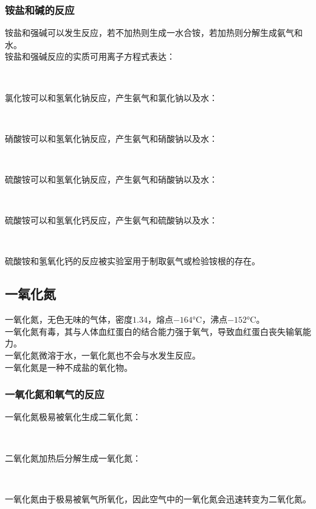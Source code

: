 \documentclass[UTF8]{ctexart}
\begin{document}
\subsubsection{铵盐和碱的反应}
    铵盐和强碱可以发生反应，若不加热则生成一水合铵，若加热则分解生成氨气和水。\\[3mm]
    铵盐和强碱反应的实质可用离子方程式表达：
    \begin{center}
        \\[6mm]
    \end{center}
    氯化铵可以和氢氧化钠反应，产生氨气和氯化钠以及水：
    \begin{center}
        \\[6mm]
    \end{center}
    硝酸铵可以和氢氧化钠反应，产生氨气和硝酸钠以及水：
    \begin{center}
        \\[6mm]
    \end{center}
    硫酸铵可以和氢氧化钠反应，产生氨气和硝酸钠以及水：
    \begin{center}
        \\[6mm]
    \end{center}
    硫酸铵可以和氢氧化钙反应，产生氨气和硫酸钠以及水：
    \begin{center}
        \\[6mm]
    \end{center}
    硫酸铵和氢氧化钙的反应被实验室用于制取氨气或检验铵根的存在。\\[3mm]

\newpage
    
\subsection{一氧化氮}
    一氧化氮，无色无味的气体，密度$1.34$，熔点$-164$\si{\degreeCelsius}，沸点$-152$\si{\degreeCelsius}。\\[3mm]
    一氧化氮有毒，其与人体血红蛋白的结合能力强于氧气，导致血红蛋白丧失输氧能力。\\[3mm]
    一氧化氮微溶于水，一氧化氮也不会与水发生反应。\\[3mm]
    一氧化氮是一种不成盐的氧化物。

\subsubsection{一氧化氮和氧气的反应}
    一氧化氮极易被氧化生成二氧化氮：
    \begin{center}
        \\[6mm]
    \end{center}
    二氧化氮加热后分解生成一氧化氮：
    \begin{center}
        \\[6mm]
    \end{center}
    一氧化氮由于极易被氧气所氧化，因此空气中的一氧化氮会迅速转变为二氧化氮。
\end{document}
